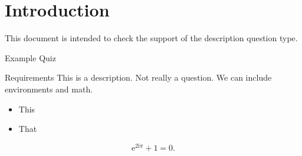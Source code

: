 \documentclass{article}
\begin{document}
\section*{Introduction}

This document is intended to check the support of the description 
question type.

\begin{quiz}{Example Quiz}
\begin{description}[tags={descr},feedback={here is a feedback}]{Requirements}
This is a description. Not really a question. We can include environments and 
math. 
\begin{itemize}
\item This
\item That
\end{itemize}
\[\mathrm{e}^{2\mathrm{i}\pi}+1=0.\]
\end{description}
\end{quiz}
\end{document}
